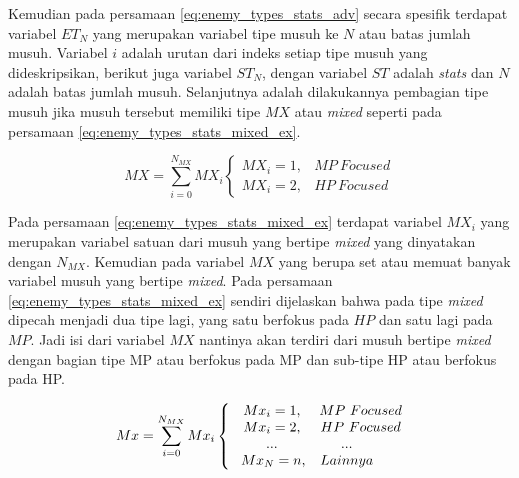 Kemudian pada persamaan \ref{eq:enemy_types_stats_adv} secara spesifik terdapat variabel $ET_{N}$ yang merupakan variabel tipe musuh ke $N$ atau batas jumlah musuh. Variabel $i$ adalah urutan dari indeks setiap tipe musuh yang dideskripsikan, berikut juga variabel $ST_{N}$, dengan variabel $ST$ adalah \textit{stats} dan $N$ adalah batas jumlah musuh. Selanjutnya adalah dilakukannya pembagian tipe musuh jika musuh tersebut memiliki tipe $MX$ atau \textit{mixed} seperti pada persamaan \ref{eq:enemy_types_stats_mixed_ex}.
\vspace{1ex}

\begin{equation}\label{eq:enemy_types_stats_mixed_ex}
MX = \sum_{i= 0}^{N_{MX}} MX_{i} \left\{\begin{matrix}
MX_{i} = 1, & MP\ Focused\\
MX_{i} = 2, & HP\ Focused
\end{matrix}\right.
\end{equation}

Pada persamaan \ref{eq:enemy_types_stats_mixed_ex} terdapat variabel $MX_{i}$ yang merupakan variabel satuan dari musuh yang bertipe \textit{mixed} yang dinyatakan dengan $N_{MX}$. Kemudian pada variabel $MX$ yang berupa set atau memuat banyak variabel musuh yang bertipe \textit{mixed}. Pada persamaan \ref{eq:enemy_types_stats_mixed_ex} sendiri dijelaskan bahwa pada tipe \textit{mixed} dipecah menjadi dua tipe lagi, yang satu berfokus pada $HP$ dan satu lagi pada $MP$. Jadi isi dari variabel $MX$ nantinya akan terdiri dari musuh bertipe \textit{mixed} dengan bagian tipe MP atau berfokus pada MP dan sub-tipe HP atau berfokus pada HP.
\vspace{1ex}

\begin{equation}\label{eq:enemy_types_stats_mixed_adv}
Mx = \sum_{i= 0}^{N_{MX}} Mx_{i} \left\{\begin{matrix}
\hspace{0.6em} Mx_{i} = 1, & MP\ Focused\\
\hspace{0.6em} Mx_{i} = 2, & HP\ Focused\\
\hspace{0.6em} ... & \hspace{-2.0em} ... \\
\hspace{0.8em} Mx_{N} = n, & \hspace{-2.0em} Lainnya\\
\end{matrix}\right.
\end{equation}


